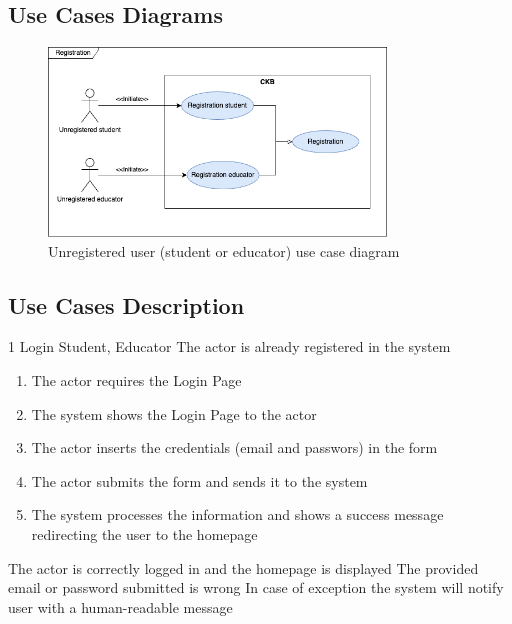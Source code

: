 \subsection{Use Cases Diagrams}
\begin{figure}[H]
    \centering
    \includegraphics[width=0.8\textwidth]{images/use_cases_diagrams/Registration.png}
    \caption{Unregistered user (student or educator) use case diagram}
    \label{fig:use_case_diagram}
\end{figure}
\clearpage

\subsection{Use Cases Description}
\usecase
{1}
{Login}
{Student, Educator}
{The actor is already registered in the system}
{
    \begin{enumerate}
        \item The actor requires the Login Page
        \item The system shows the Login Page to the actor
        \item The actor inserts the credentials (email and passwors) in the form
        \item The actor submits the form and sends it to the system
        \item The system processes the information and shows a success message redirecting the user to the homepage
    \end{enumerate}
}
{The actor is correctly logged in and the homepage is displayed}
{
    The provided email or password submitted is wrong
}
{
    In case of exception the system will notify user with a human-readable message
}
\clearpage

